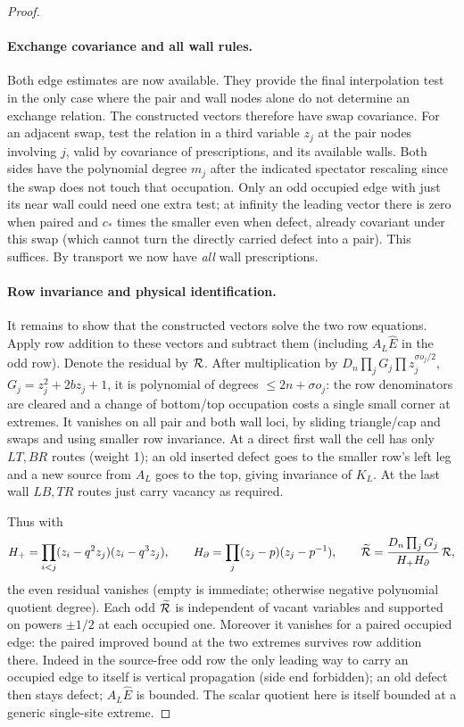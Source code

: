 \documentclass[11pt]{article}
\numberwithin{equation}{section}
\theoremstyle{definition}\newtheorem{definition}[theorem]{Definition}
\theoremstyle{remark}\newtheorem{remark}[theorem]{Remark}
\begin{document}
\begin{proof}
\paragraph{Exchange covariance and all wall rules.}
Both edge estimates are now available. They provide the final interpolation
test in the only case where the pair and wall nodes alone do not determine
an exchange relation. The constructed vectors therefore have swap covariance. For an adjacent swap, test the relation in a third variable \(z_j\) at the pair nodes involving \(j\), valid by covariance of prescriptions, and its available walls. Both sides have the polynomial degree \(m_j\) after the indicated spectator rescaling since the swap does not touch that occupation. Only an odd occupied edge with just its near wall could need one extra test; at infinity the leading vector there is zero when paired and \(c_*\) times the smaller even when defect, already covariant under this swap (which cannot turn the directly carried defect into a pair). This suffices. By transport we now have \emph{all} wall prescriptions.

\paragraph{Row invariance and physical identification.}
It remains to show that the constructed vectors solve the two row equations.
Apply row addition to these vectors and subtract them (including \(A_L\widehat E\) in the odd row). Denote the residual by \({\cal R}\). After multiplication by \(D_n\prod_j G_j\prod z_j^{\sigma o_j/2}\), \(G_j=z_j^2+2b z_j+1\), it is polynomial of degrees \(\le 2n+\sigma o_j\): the row denominators are cleared and a change of bottom/top occupation costs a single small corner at extremes. It vanishes on all pair and both wall loci, by sliding triangle/cap and swaps and using smaller row invariance. At a direct first wall the cell has only \(LT,BR\) routes (weight 1); an old inserted defect goes to the smaller row's left leg and a new source from \(A_L\) goes to the top, giving invariance of \(K_L\). At the last wall \(LB,TR\) routes just carry vacancy as required.

Thus with
\[
 H_+=\prod_{i<j}(z_i-q^2 z_j)(z_i-q^3 z_j),\qquad
 H_\partial=\prod_j(z_j-p)(z_j-p^{-1}),\qquad
 \widetilde{\cal R}=\frac{D_n\prod_j G_j}{H_+ H_\partial}\,{\cal R},
\]
the even residual vanishes (empty is immediate; otherwise negative polynomial quotient degree). Each odd \(\widetilde{\cal R}\) is independent of vacant variables and supported on powers \(\pm1/2\) at each occupied one. Moreover it vanishes for a paired occupied edge: the paired improved bound at the two extremes survives row addition there. Indeed in the source-free odd row the only leading way to carry an occupied edge to itself is vertical propagation (side end forbidden); an old defect then stays defect; \(A_L\widehat E\) is bounded. The scalar quotient here is itself bounded at a generic single-site extreme.


\end{proof}
\end{document}
